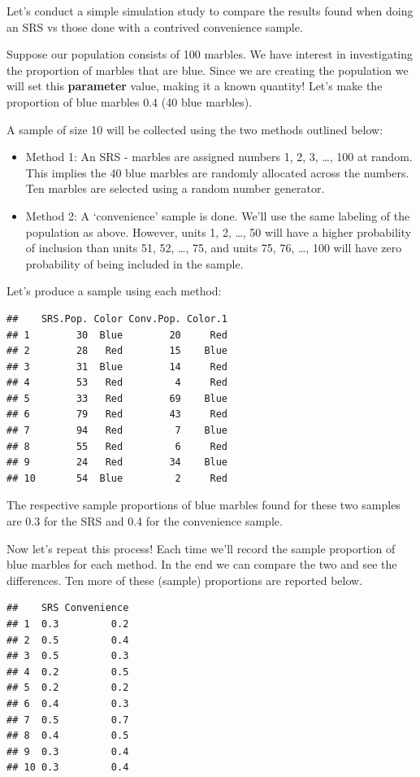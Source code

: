 \documentclass[
]{book}
\providecommand{\tightlist}{%
  \setlength{\itemsep}{0pt}\setlength{\parskip}{0pt}}
\theoremstyle{definition}
\theoremstyle{definition}
\theoremstyle{definition}
\theoremstyle{remark}
\begin{document}
Let's conduct a simple simulation study to compare the results found when doing an SRS vs those done with a contrived convenience sample.

Suppose our population consists of 100 marbles. We have interest in investigating the proportion of marbles that are blue. Since we are creating the population we will set this \textbf{parameter} value, making it a known quantity! Let's make the proportion of blue marbles 0.4 (40 blue marbles).

A sample of size 10 will be collected using the two methods outlined below:

\begin{itemize}
\tightlist
\item
  Method 1: An SRS - marbles are assigned numbers 1, 2, 3, \ldots{}, 100 at random. This implies the 40 blue marbles are randomly allocated across the numbers. Ten marbles are selected using a random number generator.\\
\item
  Method 2: A `convenience' sample is done. We'll use the same labeling of the population as above. However, units 1, 2, \ldots{}, 50 will have a higher probability of inclusion than units 51, 52, \ldots{}, 75, and units 75, 76, \ldots{}, 100 will have zero probability of being included in the sample.
\end{itemize}

Let's produce a sample using each method:

\begin{verbatim}
##    SRS.Pop. Color Conv.Pop. Color.1
## 1        30  Blue        20     Red
## 2        28   Red        15    Blue
## 3        31  Blue        14     Red
## 4        53   Red         4     Red
## 5        33   Red        69    Blue
## 6        79   Red        43     Red
## 7        94   Red         7    Blue
## 8        55   Red         6     Red
## 9        24   Red        34    Blue
## 10       54  Blue         2     Red
\end{verbatim}

The respective sample proportions of blue marbles found for these two samples are 0.3 for the SRS and 0.4 for the convenience sample.

Now let's repeat this process! Each time we'll record the sample proportion of blue marbles for each method. In the end we can compare the two and see the differences. Ten more of these (sample) proportions are reported below.

\begin{verbatim}
##    SRS Convenience
## 1  0.3         0.2
## 2  0.5         0.4
## 3  0.5         0.3
## 4  0.2         0.5
## 5  0.2         0.2
## 6  0.4         0.3
## 7  0.5         0.7
## 8  0.4         0.5
## 9  0.3         0.4
## 10 0.3         0.4
\end{verbatim}
\end{document}
